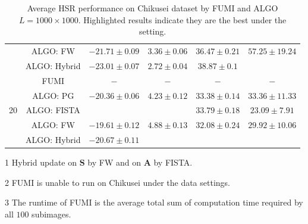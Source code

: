 \begin{table}[h]
{\begin{threeparttable}
\begin{tabular}{|c|c|c|c|c|c|}
                    & ALGO: FW               &                    {$-21.71\pm 0.09$} &                    {$3.36\pm 0.06$} &                    {$36.47\pm 0.21$} &                    {$57.25\pm 19.24$}    \tabularnewline
                    & ALGO: Hybrid \tnote{1} &                    {$-23.01\pm 0.07$} &                    {$2.72\pm 0.04$} &                    {$38.87\pm 0.1$}  & \cellcolor{red! 10}{$45.14\pm 15.01$}    \tabularnewline \hline \hline
\multirow{5}{*}{20} & FUMI\tnote{2}          & $-$                                   & $-$                                 & $-$                                  & $-$                                      \tabularnewline
                    & ALGO: PG               &                    {$-20.36\pm 0.06$} &                    {$4.23\pm 0.12$} &                    {$33.38\pm 0.14$} &                    {$33.36\pm 11.33$}    \tabularnewline
                    & ALGO: FISTA            & \cellcolor{red! 10}{$-20.62\pm 0.08$} & \cellcolor{red! 10}{$3.87\pm 0.13$} &                    {$33.79\pm 0.18$} &                    {$23.09\pm 7.91$}     \tabularnewline
                    & ALGO: FW               &                    {$-19.61\pm 0.12$} &                    {$4.88\pm 0.13$} &                    {$32.08\pm 0.24$} &                    {$29.92\pm 10.06$}    \tabularnewline
                    & ALGO: Hybrid \tnote{1} &                    {$-20.67\pm 0.11$} & \cellcolor{red! 10}{$3.87\pm 0.07$} & \cellcolor{red! 10}{$33.94\pm 0.22$} & \cellcolor{red! 10}{$20.27\pm 6.84$}     \tabularnewline \hline
\end{tabular}
\begin{tablenotes}
\item[1] Hybrid update on $\bm S$ by FW and on $\bm A$ by FISTA.
\item[2] FUMI is unable to run on Chikusei under the data settings.
\item[3] The runtime of FUMI is the average total sum of computation time
         required by all $100$ subimages.
\end{tablenotes}
\end{threeparttable}
}
\caption{Average HSR performance on Chikusei dataset by FUMI and ALGO
         $L = 1000 \times 1000$. Highlighted results indicate they are the
         best under the setting.}
\label{table:ALGO_vs_FUMI_REAL_CHIKUSEI_MO9_MO16}
\end{table}

